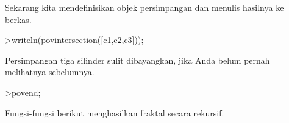 \documentclass[a4paper,10pt]{article}
\begin{document}
\begin{eulernotebook}
\begin{eulercomment}
\begin{eulercomment}
\begin{eulercomment}
\begin{eulercomment}
\begin{eulercomment}
\begin{eulercomment}
\begin{eulercomment}
\begin{eulercomment}
\begin{eulercomment}
\begin{eulercomment}
\begin{eulercomment}
\begin{eulercomment}
\begin{eulercomment}
\begin{eulercomment}
\begin{eulercomment}
\begin{eulercomment}
\begin{euleroutput}
\end{euleroutput}
\begin{eulercomment}
Sekarang kita mendefinisikan objek persimpangan dan menulis hasilnya
ke berkas.
\end{eulercomment}
\begin{eulerprompt}
>writeln(povintersection([c1,c2,c3]));
\end{eulerprompt}
\begin{eulercomment}
Persimpangan tiga silinder sulit dibayangkan, jika Anda belum pernah
melihatnya sebelumnya.
\end{eulercomment}
\begin{eulerprompt}
>povend;
\end{eulerprompt}
\begin{eulercomment}
Fungsi-fungsi berikut menghasilkan fraktal secara rekursif.


\end{eulercomment}
\end{eulercomment}
\end{eulercomment}
\end{eulercomment}
\end{eulercomment}
\end{eulercomment}
\end{eulercomment}
\end{eulercomment}
\end{eulercomment}
\end{eulercomment}
\end{eulercomment}
\end{eulercomment}
\end{eulercomment}
\end{eulercomment}
\end{eulercomment}
\end{eulercomment}
\end{eulercomment}
\end{eulernotebook}
\end{document}
